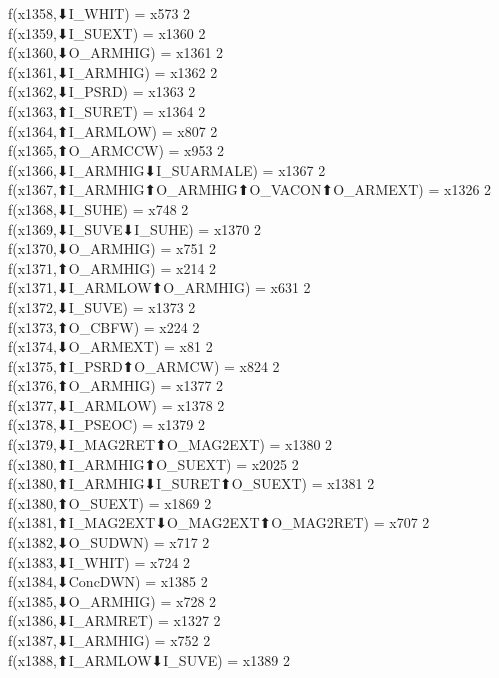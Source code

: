 f(x1358,⬇I_WHIT) = x573 {2} \\
f(x1359,⬇I_SUEXT) = x1360 {2} \\
f(x1360,⬇O_ARMHIG) = x1361 {2} \\
f(x1361,⬇I_ARMHIG) = x1362 {2} \\
f(x1362,⬇I_PSRD) = x1363 {2} \\
f(x1363,⬆I_SURET) = x1364 {2} \\
f(x1364,⬆I_ARMLOW) = x807 {2} \\
f(x1365,⬆O_ARMCCW) = x953 {2} \\
f(x1366,⬇I_ARMHIG⬇I_SUARMALE) = x1367 {2} \\
f(x1367,⬆I_ARMHIG⬆O_ARMHIG⬆O_VACON⬆O_ARMEXT) = x1326 {2} \\
f(x1368,⬇I_SUHE) = x748 {2} \\
f(x1369,⬇I_SUVE⬇I_SUHE) = x1370 {2} \\
f(x1370,⬇O_ARMHIG) = x751 {2} \\
f(x1371,⬆O_ARMHIG) = x214 {2} \\
f(x1371,⬇I_ARMLOW⬆O_ARMHIG) = x631 {2} \\
f(x1372,⬇I_SUVE) = x1373 {2} \\
f(x1373,⬆O_CBFW) = x224 {2} \\
f(x1374,⬇O_ARMEXT) = x81 {2} \\
f(x1375,⬆I_PSRD⬆O_ARMCW) = x824 {2} \\
f(x1376,⬆O_ARMHIG) = x1377 {2} \\
f(x1377,⬇I_ARMLOW) = x1378 {2} \\
f(x1378,⬇I_PSEOC) = x1379 {2} \\
f(x1379,⬇I_MAG2RET⬆O_MAG2EXT) = x1380 {2} \\
f(x1380,⬆I_ARMHIG⬆O_SUEXT) = x2025 {2} \\
f(x1380,⬆I_ARMHIG⬇I_SURET⬆O_SUEXT) = x1381 {2} \\
f(x1380,⬆O_SUEXT) = x1869 {2} \\
f(x1381,⬆I_MAG2EXT⬇O_MAG2EXT⬆O_MAG2RET) = x707 {2} \\
f(x1382,⬇O_SUDWN) = x717 {2} \\
f(x1383,⬇I_WHIT) = x724 {2} \\
f(x1384,⬇ConcDWN) = x1385 {2} \\
f(x1385,⬇O_ARMHIG) = x728 {2} \\
f(x1386,⬇I_ARMRET) = x1327 {2} \\
f(x1387,⬇I_ARMHIG) = x752 {2} \\
f(x1388,⬆I_ARMLOW⬇I_SUVE) = x1389 {2} \\

